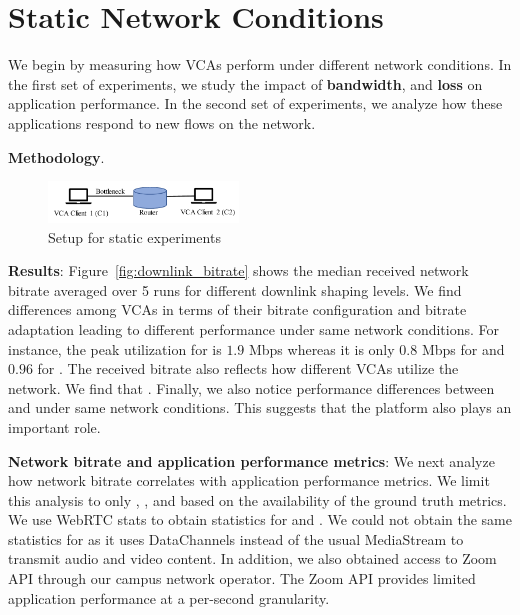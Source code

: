 \section{Static Network Conditions}\label{sec:methodology}
We begin by measuring how VCAs perform under different network conditions. 
In the first set of experiments, we study the impact of \textbf{bandwidth},
and \textbf{loss} on application performance. In the second set of experiments, 
we analyze how these applications respond to new flows on the network.


\noindent\textbf{Methodology}. 

\begin{center}
   \begin{figure}[]
    \includegraphics[width=0.45\textwidth,keepaspectratio]{../figures/methodology/normal-setup.pdf}
    \caption{Setup for static experiments}
    \label{fig:static_setup}
    \end{figure}
\end{center}


\noindent \textbf{Results}: Figure~\ref{fig:downlink_bitrate} shows the median received network bitrate averaged over 5 runs for different downlink shaping levels. We find differences among VCAs in terms of their bitrate configuration and bitrate adaptation leading to different performance under same network conditions. For instance, the peak utilization for \teamsnative is $1.9$ Mbps whereas it is only $0.8$ Mbps for \meet and $0.96$ for \zoomnative. The received bitrate also reflects how different VCAs utilize the network. We find that \zoomnative . Finally, we also notice performance differences between \teamsbrowser and \teamsnative under same network conditions. This suggests that the platform also plays an important role.  

\textbf{Network bitrate and application performance metrics}: We next analyze how network bitrate correlates with application performance metrics. We limit this analysis to only \meet, \teamschrome, and \zoomnative based on the availability of the ground truth metrics. We use WebRTC stats to obtain statistics for \teamschrome and \meet. We could not obtain the same statistics for \zoombrowser as it uses DataChannels instead of the usual MediaStream to transmit audio and video content. In addition, we also obtained access to Zoom API through our campus network operator. The Zoom API provides limited application performance at a per-second granularity.  

